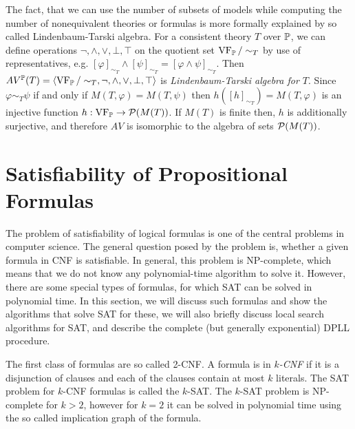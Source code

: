 The fact, that we can use the number of subsets of models while computing the number of nonequivalent theories or formulas is more formally explained by so called Lindenbaum-Tarski algebra. For a consistent theory $T$ over $\mathbb{P}$, we can define operations $\neg, \land, \lor, \bot, \top$ on the quotient set $\operatorname{VF}_\mathbb{P}/\sim_T$ by use of representatives, e.g. $[\varphi]_{\sim_T} \land [\psi]_{\sim_T} = [\varphi \land \psi]_{\sim_T}$. Then $AV^\mathbb{P}(T) = \langle \operatorname{VF}_\mathbb{P}/\sim_T, \neg, \land, \lor, \bot, \top \rangle$ is \emph{Lindenbaum-Tarski algebra for $T$}. Since $\varphi \sim_T \psi$ if and only if $M(T, \varphi) = M(T, \psi)$ then $h([h]_{\sim_T}) = M(T, \varphi)$ is an injective function $h: \operatorname{VF}_\mathbb{P} \to \mathcal{P}(M(T))$. If $M(T)$ is finite then, $h$ is additionally surjective, and therefore $AV$ is isomorphic to the algebra of sets $\mathcal{P}(M(T))$.


\section{Satisfiability of Propositional Formulas}

The problem of satisfiability of logical formulas is one of the central problems in computer science. The general question posed by the problem is, whether a given formula in CNF is satisfiable. In general, this problem is NP-complete, which means that we do not know any polynomial-time algorithm to solve it. However, there are some special types of formulas, for which SAT can be solved in polynomial time. In this section, we will discuss such formulas and show the algorithms that solve SAT for these, we will also briefly discuss local search algorithms for SAT, and describe the complete (but generally exponential) DPLL procedure.

The first class of formulas are so called 2-CNF. A formula is in \emph{$k$-CNF} if it is a disjunction of clauses and each of the clauses contain at most $k$ literals. The SAT problem for $k$-CNF formulas is called the $k$-SAT. The $k$-SAT problem is NP-complete for $k>2$, however for $k=2$ it can be solved in polynomial time using the so called implication graph of the formula. 

